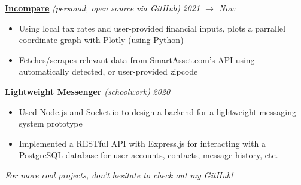 \documentclass[10pt]{article}
\begin{document}
\begin{flushleft}
		\vspace{2.25mm}
		\textbf{\href{https://github.com/avigloz/incompare}{Incompare}} \textit{(personal, open source via GitHub)} \hfill \textit{\small 2021 $\rightarrow$ Now}
		\vspace{-2mm}
		\begin{itemize}
			\item Using local tax rates and user-provided financial inputs, plots a parrallel coordinate graph with Plotly (using Python)
			\vspace{-2mm}
			\item Fetches/scrapes relevant data from SmartAsset.com's API using automatically detected, or user-provided zipcode
		\end{itemize}
		\vspace{-1.5mm}
		\textbf{Lightweight Messenger} \textit{(schoolwork)} \hfill \textit{\small 2020}
		\vspace{-2mm}
		\begin{itemize}
			\item Used Node.js and Socket.io to design a backend for a lightweight messaging system prototype
			\vspace{-2mm}
			\item Implemented a RESTful API with Express.js for interacting with a PostgreSQL database for user accounts, contacts, message history, etc.
		\end{itemize}
		\vspace{-1mm}
		{\footnotesize \textit{For more cool projects, don't hesitate to check out my GitHub!}}

		

\end{flushleft}
\end{document}
